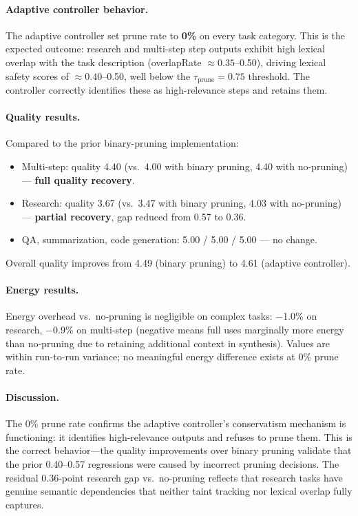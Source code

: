\documentclass[sigconf,authordraft]{acmart}
\begin{document}
\paragraph{Adaptive controller behavior.}
The adaptive controller set prune rate to \textbf{0\%} on every task category.
This is the expected outcome: research and multi-step step outputs exhibit high lexical overlap with the task description (overlapRate $\approx 0.35$--0.50), driving lexical safety scores of $\approx 0.40$--0.50, well below the $\tau_{\text{prune}} = 0.75$ threshold.
The controller correctly identifies these as high-relevance steps and retains them.

\paragraph{Quality results.}
Compared to the prior binary-pruning implementation:
\begin{itemize}[leftmargin=2em,itemsep=2pt]
  \item Multi-step: quality 4.40 (vs.\ 4.00 with binary pruning, 4.40 with no-pruning) --- \textbf{full quality recovery}.
  \item Research: quality 3.67 (vs.\ 3.47 with binary pruning, 4.03 with no-pruning) --- \textbf{partial recovery}, gap reduced from 0.57 to 0.36.
  \item QA, summarization, code generation: 5.00 / 5.00 / 5.00 --- no change.
\end{itemize}
Overall quality improves from 4.49 (binary pruning) to 4.61 (adaptive controller).

\paragraph{Energy results.}
Energy overhead vs.\ no-pruning is negligible on complex tasks: $-$1.0\% on research, $-$0.9\% on multi-step (negative means full uses marginally more energy than no-pruning due to retaining additional context in synthesis).
Values are within run-to-run variance; no meaningful energy difference exists at 0\% prune rate.

\paragraph{Discussion.}
The 0\% prune rate confirms the adaptive controller's conservatism mechanism is functioning: it identifies high-relevance outputs and refuses to prune them.
This is the correct behavior---the quality improvements over binary pruning validate that the prior 0.40--0.57 regressions were caused by incorrect pruning decisions.
The residual 0.36-point research gap vs.\ no-pruning reflects that research tasks have genuine semantic dependencies that neither taint tracking nor lexical overlap fully captures.
\end{document}
